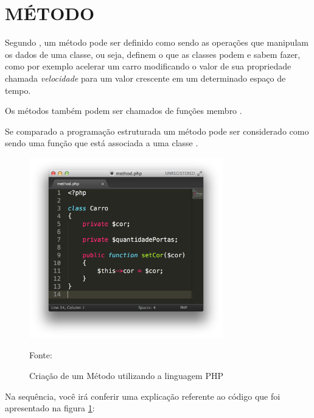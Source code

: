 \section{MÉTODO}

Segundo , um
método pode ser definido como sendo as operações que manipulam os dados de uma 
classe, ou seja, definem o que as classes podem e sabem fazer, como por exemplo 
acelerar um carro modificando o valor de sua propriedade chamada 
\textit{velocidade} para um valor crescente em um determinado espaço de tempo.

Os métodos também podem ser chamados de funções membro \cite{c++ComoProgramar}.

Se comparado a programação estruturada um método pode ser considerado como sendo
uma função que está associada a uma classe \cite{programmingPhp}.

\begin{figure}[h!tb]
	\caption{Criação de um Método utilizando a linguagem PHP}
	\label{fig:metodo}
	
	\centering
	\includegraphics[width=0.75\textwidth]{images/method.png}
	
	\centering
	\footnotesize Fonte: \fonteOAutor
\end{figure}

\FloatBarrier 	%

Na sequência, você irá conferir uma explicação referente ao código que foi
apresentado na figura \ref{fig:metodo}:

